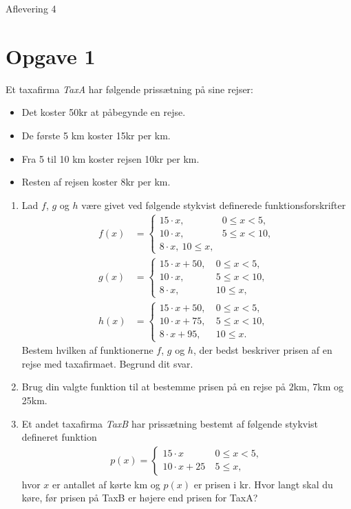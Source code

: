 
\begin{center}
\Huge
Aflevering 4
\end{center}

\section*{Opgave 1}
Et taxafirma \textit{TaxA} har følgende prissætning på sine rejser: 
\begin{itemize}
\item Det koster 50kr at påbegynde en rejse.
\item De første 5 km koster 15kr per km.
\item Fra 5 til 10 km koster rejsen 10kr per km.
\item Resten af rejsen koster 8kr per km.   
\end{itemize}
\begin{enumerate}[label=\roman*)]
\item Lad $f$, $g$ og $h$ være givet ved følgende stykvist definerede funktionsforskrifter
\begin{align*}
f(x) &= \begin{cases} 15\cdot x, \ &0\leq x < 5,\\
10 \cdot x, \ &5\leq x < 10,\\
8\cdot x, \ 10 \leq x,
\end{cases}\\
g(x) &= \begin{cases}
15\cdot x + 50, \ &0\leq x < 5,\\
10 \cdot x, \ &5\leq x < 10,\\
8\cdot x, \ &10 \leq x,
\end{cases}\\
h(x) &= \begin{cases}
15\cdot x + 50, \ &0\leq x < 5,\\
10 \cdot x + 75, \ &5\leq x < 10,\\
8\cdot x +95, \ &10 \leq x.
\end{cases}
\end{align*}
Bestem hvilken af funktionerne $f$, $g$ og $h$, der bedst beskriver prisen af en rejse med taxafirmaet. Begrund dit svar.
\item Brug din valgte funktion til at bestemme prisen på en rejse på $2$km, 7km og 25km.
\item Et andet taxafirma \textit{TaxB} har prissætning bestemt af følgende stykvist defineret funktion
\begin{align*}
p(x) = 
\begin{cases}
15\cdot x \ &0\leq x < 5,\\
10 \cdot x + 25 \ &5 \leq x,
\end{cases}
\end{align*}
hvor $x$ er antallet af kørte km og $p(x)$ er prisen i kr. Hvor langt skal du køre, før prisen på TaxB er højere end prisen for TaxA?
\end{enumerate}

